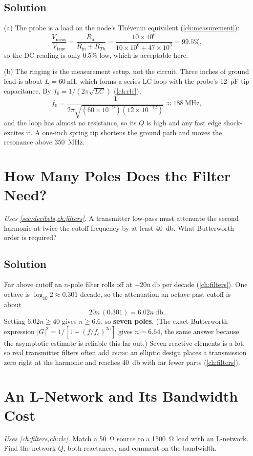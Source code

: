 \subsection*{Solution}
(a) The probe is a load on the node's Th\'evenin equivalent
(\cref{ch:measurement}):
\[
\frac{V_{\text{meas}}}{V_{\text{true}}}=\frac{R_{\mathrm{in}}}{R_{\mathrm{in}}+R_{Th}}
=\frac{10\times10^6}{10\times10^6+47\times10^3}=99.5\%,
\]
so the DC reading is only \(0.5\%\) low, which is acceptable here.

(b) The ringing is the measurement setup, not the circuit. Three inches of ground lead
is about \(L=\SI{60}{\nano\henry}\), which forms a series LC loop with the probe's
\SI{12}{\pico\farad} tip capacitance. By \(f_0=1/(2\pi\sqrt{LC})\)
(\cref{ch:rlc}),
\[
f_0=\frac{1}{2\pi\sqrt{(60\times10^{-9})(12\times10^{-12})}}\approx\SI{188}{\mega\hertz},
\]
and the loop has almost no resistance, so its \(Q\) is high and any fast edge
shock-excites it. A one-inch spring tip shortens the ground path and moves the
resonance above \SI{350}{\mega\hertz}.

\section{How Many Poles Does the Filter Need?}
\emph{Uses \cref{sec:decibels,ch:filters}.} A transmitter low-pass must attenuate the
second harmonic at twice the cutoff frequency by at least \SI{40}{\decibel}. What
Butterworth order is required?

\subsection*{Solution}
Far above cutoff an \(n\)-pole filter rolls off at \(-20n\ \si{\decibel}\) per decade
(\cref{ch:filters}). One octave is \(\log_{10}2\approx0.301\) decade, so the
attenuation an octave past cutoff is about
\[
20n\,(0.301)=6.02n\ \si{\decibel}.
\]
Setting \(6.02n\ge40\) gives \(n\ge6.6\), so \textbf{seven poles}. (The exact
Butterworth expression \(|G|^2=1/[1+(f/f_c)^{2n}]\) gives \(n=6.64\), the same
answer because the asymptotic estimate is reliable this far out.) Seven reactive
elements is a lot, so real transmitter filters often add \emph{zeros}: an
elliptic design places a transmission zero right at the harmonic and reaches
\SI{40}{\decibel} with far fewer parts (\cref{ch:filters}).

\section{An L-Network and Its Bandwidth Cost}
\emph{Uses \cref{ch:filters,ch:rlc}.} Match a \SI{50}{\ohm}
source to a \SI{1500}{\ohm} load with an L-network. Find the network \(Q\), both
reactances, and comment on the bandwidth.

